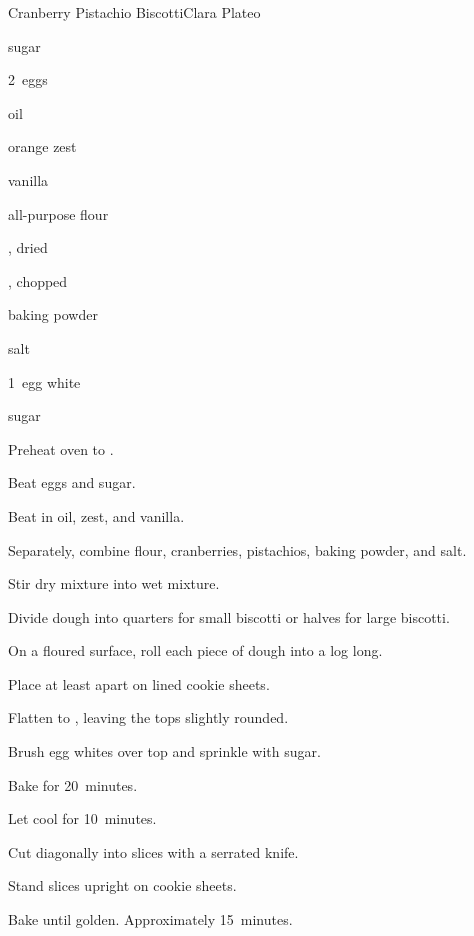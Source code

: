 \begin{recipe}{Cranberry Pistachio Biscotti}{Clara Plateo}{}

\begin{ingredients}
\item \C{\threequarter} sugar
\item 2~eggs
\item \C{\quarter} oil
\item \tp{1\half} orange zest
\item \tp{1\half} vanilla
\item {} all-purpose flour
\item \C{\half} , dried
\item \C{\half} , chopped
\item {} baking powder
\item \tp{\quarter} salt
\item 1~egg white
\item {} sugar
\end{ingredients}

\begin{directions}
\item Preheat oven to .
\item Beat eggs and \C{\threequarter} sugar.
\item Beat in oil, zest, and vanilla.
\item Separately, combine flour, cranberries, pistachios, baking powder, and salt.
\item Stir dry mixture into wet mixture.
\item Divide dough into quarters for small biscotti or halves for large biscotti.
\item On a floured surface, roll each piece of dough into a log  long.
\item Place at least  apart on lined cookie sheets.
\item Flatten to \inch{\threequarter}, leaving the tops slightly rounded.
\item Brush egg whites over top and sprinkle with sugar.
\item Bake for 20~minutes.
\item Let cool for 10~minutes.
\item Cut diagonally into \inch{\half} slices with a serrated knife.
\item Stand slices upright on cookie sheets.
\item Bake until golden. Approximately 15~minutes.
\end{directions}

\end{recipe}
